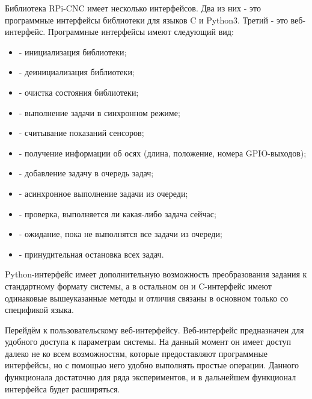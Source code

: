 \documentclass[14pt,russian,a4paper]{extarticle}
\newcounter{subsubsubsection}[subsubsection]
\begin{document}
Библиотека RPi-CNC имеет несколько интерфейсов. Два из них - это программные интерфейсы библиотеки для языков C и Python3. Третий - это веб-интерфейс. Программные интерфейсы имеют следующий вид:
\begin{itemize}
    \item {} - инициализация библиотеки;
    \item {} - деинициализация библиотеки;
    \item {} - очистка состояния библиотеки;
    \item {} - выполнение задачи в синхронном режиме;
    \item {} - считывание показаний сенсоров;
    \item {} - получение информации об осях (длина, положение, номера GPIO-выходов);
    \item {} - добавление задачу в очередь задач;
    \item {} - асинхронное выполнение задачи из очереди;
    \item {} - проверка, выполняется ли какая-либо задача сейчас;
    \item {} - ожидание, пока не выполнятся все задачи из очереди;
    \item {} - принудительная остановка всех задач.
\end{itemize}
Python-интерфейс имеет дополнительную возможность преобразования задания к стандартному формату системы, а в остальном он и C-интерфейс имеют одинаковые вышеуказанные методы и отличия связаны в основном только со спецификой языка.
\newline

Перейдём к пользовательскому веб-интерфейсу. Веб-интерфейс предназначен для удобного доступа к параметрам системы. На данный момент он имеет доступ далеко не ко всем возможностям, которые предоставляют программные интерфейсы, но с помощью него удобно выполнять простые операции. Данного функционала достаточно для ряда экспериментов, и в дальнейшем функционал интерфейса будет расширяться.
\end{document}
